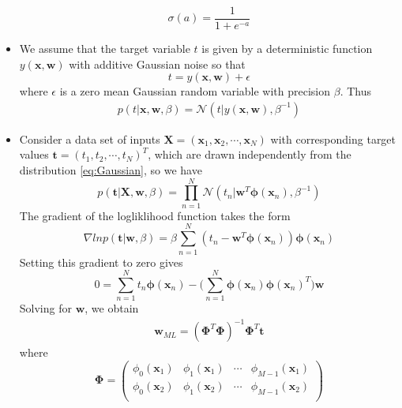 \documentclass[12pt, a4paper]{article}
\newcommand{\N}{\mathcal{N}}
\begin{document}
\begin{itemize}
        \begin{equation}
            \sigma(a)=\frac{1}{1+e^{-a}}
        \end{equation}
        \item We assume that the target variable $t$ is given by a deterministic function $y(\bm{x},\bm{w})$
        with additive Gaussian noise so that
        \begin{equation*}
            t=y(\bm{x},\bm{w})+\epsilon
        \end{equation*}
        where $\epsilon$ is a zero mean Gaussian random variable with precision $\beta$. Thus
        \begin{eqnarray}
            \label{eq:Gaussian}
            p(t|\bm{x},\bm{w},\beta)=\N (t|y(\bm{x},\bm{w}),\beta^{-1})
        \end{eqnarray}
        \item Consider a data set of inputs $\bm{X}=(\bm{x}_1,\bm{x}_2,\cdots,\bm{x}_N)$ with corresponding
        target values $\bm{t}=(t_1,t_2,\cdots,t_N)^T$, which are drawn independently from the distribution
        \ref{eq:Gaussian}, so we have
        \begin{equation*}
            p(\bm{t}|\bm{X},\bm{w},\beta)=\prod_{n=1}^N\N (t_n|\bm{w}^T\bm{\phi}(\bm{x}_n),\beta^{-1})
        \end{equation*}
        The gradient of the logliklihood function takes the form
        \begin{equation}
            \nabla lnp(\bm{t}|\bm{w},\beta)=\beta\sum_{n=1}^N(t_n-\bm{w}^T\bm{\phi}(\bm{x}_n))
            \bm{\phi}(\bm{x}_n)
        \end{equation}
        Setting this gradient to zero gives
        \begin{equation*}
            0=\sum_{n=1}^Nt_n\bm{\phi}(\bm{x}_n)-\Big(\sum_{n=1}^N\bm{\phi}(\bm{x}_n)\bm{\phi}(\bm{x}_n)^T
            \Big)\bm{w}
        \end{equation*}
        Solving for $\bm{w}$, we obtain
        \begin{eqnarray}
            \bm{w}_{ML}=(\bm{\Phi}^T\bm{\Phi})^{-1}\bm{\Phi}^T\bm{t}
        \end{eqnarray}
        where 
        \begin{equation*}
            \bm{\Phi}=\begin{pmatrix}
                \phi_0(\bm{x}_1) & \phi_1(\bm{x}_1) & \cdots & \phi_{M-1}(\bm{x}_1)\\
                \phi_0(\bm{x}_2) & \phi_1(\bm{x}_2) & \cdots & \phi_{M-1}(\bm{x}_2)\\

\end{pmatrix}
\end{equation*}
\end{itemize}
\end{document}
